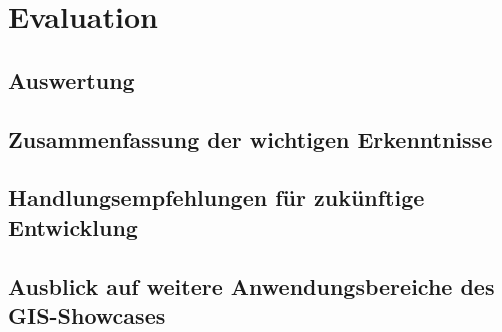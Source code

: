 \chapter{Evaluation}

\section{Auswertung}
\section{Zusammenfassung der wichtigen Erkenntnisse}
\section{Handlungsempfehlungen für zukünftige Entwicklung}
\section{Ausblick auf weitere Anwendungsbereiche des GIS-Showcases}

